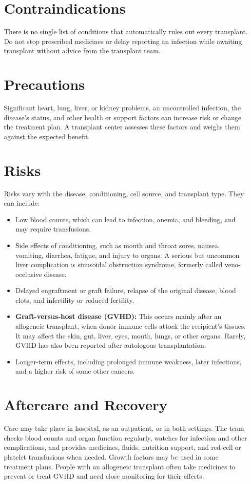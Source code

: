 \section*{Contraindications}
There is no single list of conditions that automatically rules out every transplant. Do not stop prescribed medicines or delay reporting an infection while awaiting transplant without advice from the transplant team.

\section*{Precautions}
Significant heart, lung, liver, or kidney problems, an uncontrolled infection, the disease's status, and other health or support factors can increase risk or change the treatment plan. A transplant center assesses these factors and weighs them against the expected benefit.

\section*{Risks}
Risks vary with the disease, conditioning, cell source, and transplant type. They can include:
\begin{itemize}
  \item Low blood counts, which can lead to infection, anemia, and bleeding, and may require transfusions.
  \item Side effects of conditioning, such as mouth and throat sores, nausea, vomiting, diarrhea, fatigue, and injury to organs. A serious but uncommon liver complication is sinusoidal obstruction syndrome, formerly called veno-occlusive disease.
  \item Delayed engraftment or graft failure, relapse of the original disease, blood clots, and infertility or reduced fertility.
  \item \textbf{Graft-versus-host disease (GVHD):} This occurs mainly after an allogeneic transplant, when donor immune cells attack the recipient's tissues. It may affect the skin, gut, liver, eyes, mouth, lungs, or other organs. Rarely, GVHD has also been reported after autologous transplantation.
  \item Longer-term effects, including prolonged immune weakness, later infections, and a higher risk of some other cancers.
\end{itemize}

\section*{Aftercare and Recovery}
Care may take place in hospital, as an outpatient, or in both settings. The team checks blood counts and organ function regularly, watches for infection and other complications, and provides medicines, fluids, nutrition support, and red-cell or platelet transfusions when needed. Growth factors may be used in some treatment plans. People with an allogeneic transplant often take medicines to prevent or treat GVHD and need close monitoring for their effects.

